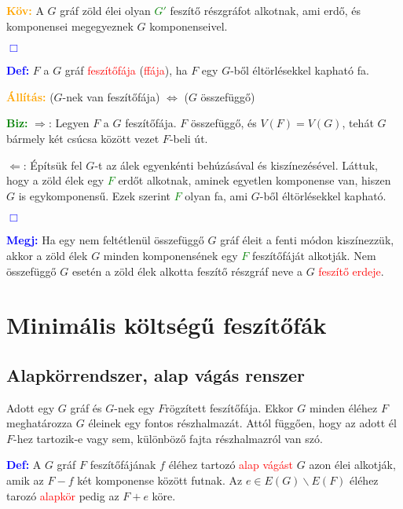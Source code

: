 \documentclass[12pt]{article}
\begin{document}
			\textcolor{orange}{\textbf{Köv:}} A $G$ gráf zöld élei olyan \textcolor{green}{$G'$} feszítő részgráfot alkotnak, ami erdő, és komponensei megegyeznek $G$ komponenseivel. \raggedright \textcolor{blue}{$\Box$} 

			\textcolor{blue}{\textbf{Def:}} $F$ a $G$ gráf \textcolor{red}{feszítőfája} (\textcolor{red}{ffája}), ha $F$ egy $G$-ből éltörlésekkel kapható fa.

			\textcolor{orange}{\textbf{Állítás:}} ($G$-nek van feszítőfája) $\Longleftrightarrow$ ($G$ összefüggő)

			\textcolor{green}{\textbf{Biz:}} $\Rightarrow$: Legyen $F$ a $G$ feszítőfája. $F$ összefüggő, és $V(F)=V(G)$, tehát $G$ bármely két csúcsa között vezet $F$-beli út.

			$\Leftarrow$: Építsük fel $G$-t az álek egyenkénti behúzásával és kiszínezésével. Láttuk, hogy a zöld élek egy \textcolor{green}{$F$} erdőt alkotnak, aminek egyetlen komponense van, hiszen $G$ is egykomponensű. Ezek szerint \textcolor{green}{$F$} olyan fa, ami $G$-ből éltörlésekkel kapható. \raggedright \textcolor{blue}{$\Box$} 
		
			\textcolor{blue}{\textbf{Megj:}} Ha egy nem feltétlenül összefüggő $G$ gráf éleit a fenti módon kiszínezzük, akkor a zöld élek $G$ minden komponensének egy \textcolor{green}{$F$} feszítőfáját alkotják. Nem összefüggő $G$ esetén a zöld élek alkotta feszítő részgráf neve a $G$ \textcolor{red}{feszítő erdeje}.

	\section{Minimális költségű feszítőfák}

		\subsection{Alapkörrendszer, alap vágás renszer}

			Adott egy $G$ gráf és $G$-nek egy $F$rögzített feszítőfája. Ekkor $G$ minden éléhez $F$ meghatározza $G$ éleinek egy fontos részhalmazát. Attól függően, hogy az adott él $F$-hez tartozik-e vagy sem, különböző fajta részhalmazról van szó.

			\textcolor{blue}{\textbf{Def:}} A $G$ gráf $F$ feszítőfájának $f$ éléhez tartozó \textcolor{red}{alap vágást} $G$ azon élei alkotják, amik az $F-f$ két komponense között futnak. Az $e \in E(G) \backslash E(F)$ éléhez tarozó \textcolor{red}{alapkör} pedig az $F+e$ köre.
\end{document}
